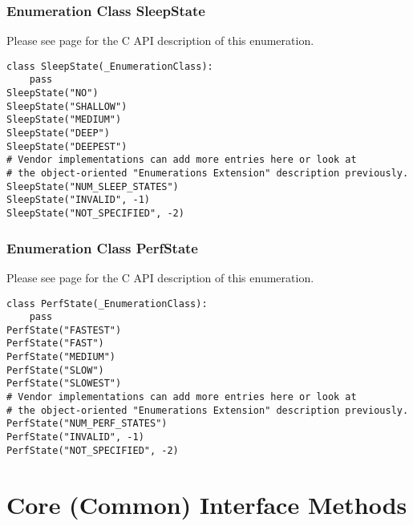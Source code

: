 \documentclass[12pt]{report} %
\begin{document}
\begin{appendices}
\subsubsection{Enumeration Class SleepState}\label{class:SleepState}

Please see page \pageref{type:SleepState} for the C API description of this
enumeration.

\begin{center}\begin{minipage}{.95\linewidth}\begin{lstlisting}
class SleepState(_EnumerationClass):
    pass
SleepState("NO")
SleepState("SHALLOW")
SleepState("MEDIUM")
SleepState("DEEP")
SleepState("DEEPEST")
# Vendor implementations can add more entries here or look at  
# the object-oriented "Enumerations Extension" description previously. 
SleepState("NUM_SLEEP_STATES")
SleepState("INVALID", -1)
SleepState("NOT_SPECIFIED", -2)
\end{lstlisting}\end{minipage}\end{center}

\subsubsection{Enumeration Class PerfState}\label{class:PerfState}

Please see page \pageref{type:PerfState} for the C API description of this
enumeration.

\begin{center}\begin{minipage}{.95\linewidth}\begin{lstlisting}
class PerfState(_EnumerationClass):
    pass
PerfState("FASTEST")
PerfState("FAST")
PerfState("MEDIUM")
PerfState("SLOW")
PerfState("SLOWEST")
# Vendor implementations can add more entries here or look at  
# the object-oriented "Enumerations Extension" description previously. 
PerfState("NUM_PERF_STATES")
PerfState("INVALID", -1)
PerfState("NOT_SPECIFIED", -2)
\end{lstlisting}\end{minipage}\end{center}



\section{Core (Common) Interface Methods}
\label{sec:PythonCoreInterfaceFunctions}


\end{appendices}
\end{document}
